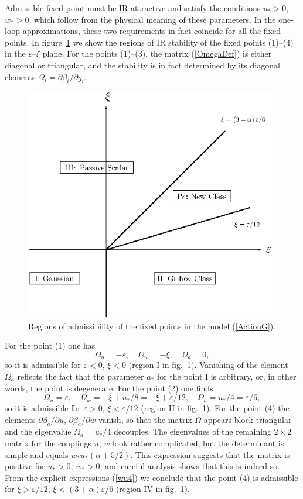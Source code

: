 \documentclass[12pt]{article}
\begin{document}
Admissible fixed point must be IR attractive and satisfy the conditions
$u_{*}>0$, $w_{*}>0$, which follow from the physical meaning of these
parameters. In the one-loop approximations, these two requirements in fact
coincide for all the fixed points. In figure~\ref{fig:patt} we show
the regions of IR stability of the fixed points (1)--(4) in the
$\varepsilon$--$\xi$ plane. For the points (1)--(3), the matrix
(\ref{OmegaDef}) is either diagonal
or triangular, and the stability is in fact determined by its diagonal
elements $\Omega_{i} = \partial\beta_{i}/\partial g_{i}$.

\begin{figure}
\begin{center}
\includegraphics[width=11cm]{PATT.EPS}
\caption{\label{fig:patt}
Regions of admissibility of the fixed points in
the model (\protect\ref{ActionG}).}
\end{center}
\end{figure}


For the point (1) one has
\[ \Omega_{u} = -\varepsilon, \quad  \Omega_{w} = -\xi, \quad \Omega_{a} = 0, \]
so it is admissible for $\varepsilon<0$, $\xi<0$ (region I in
fig.~\ref{fig:patt}). Vanishing of the element $\Omega_{a}$ reflects the
fact that the parameter $a_{*}$ for the point I is arbitrary, or, in other
words, the point is degenerate.
For the point (2) one finds
\[ \Omega_{u} = \varepsilon, \quad
\Omega_{w} = -\xi+u_{*}/8 = -\xi+\varepsilon/12,
\quad \Omega_{a} = u_{*}/4 = \varepsilon/6, \]
so it is admissible for $\varepsilon>0$, $\xi<\varepsilon/12$
(region II in fig.~\ref{fig:patt}).
For the point (4) the elements $\partial\beta_{a}/\partial u$,
$\partial\beta_{a}/\partial w$ vanish, so that the matrix $\Omega$ appears
block-triangular and the eigenvalue $\Omega_{a} = u_{*}/4$ decouples.
The eigenvalues of the remaining $2\times2$ matrix for the couplings
$u$, $w$ look rather complicated, but the determinant is simple and equals
$w_{*}u_{*} (\alpha+5/2)$. This expression suggests that the matrix is
positive for $u_{*}>0$, $w_{*}>0$, and careful analysis shows that this
is indeed so. From the explicit expressions (\ref{wu4}) we conclude that
the point (4) is admissible for $\xi>\varepsilon/12$,
$\xi< (3+\alpha) \varepsilon/6$ (region IV in fig.~\ref{fig:patt}).
\end{document}
